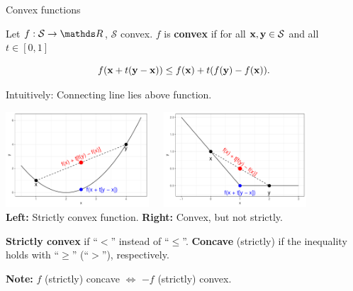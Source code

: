 \documentclass[11pt,compress,t,notes=noshow, xcolor=table]{beamer}
\begin{document}
\begin{vbframe}{Convex functions}

Let $f: \mathcal{S} \to \R$, $\mathcal{S}$ convex.
$f$ is \textbf{convex} if for all $\mathbf{x}, \mathbf{y} \in \mathcal{S}$ and all $t \in [0, 1]$

\vspace{-0.5\baselineskip}

\begin{equation*}
    f(\mathbf{x} + t(\mathbf{y} - \mathbf{x})) \le f(\mathbf{x}) + t(f(\mathbf{y}) - f(\mathbf{x})).    
\end{equation*}

Intuitively: Connecting line lies above function.

\begin{center}
    \includegraphics[width = 0.4\textwidth, keepaspectratio]{figure_man/convexity_1.pdf}~~~\includegraphics[width = 0.40\textwidth, keepaspectratio]{figure_man/convexity_2.pdf} \\
    \footnotesize{
        \textbf{Left:} Strictly convex function.
        \textbf{Right:} Convex, but not strictly. }
\end{center}

\textbf{Strictly convex} if \enquote{$<$} instead of \enquote{$\le$}. \textbf{Concave} (strictly) if the inequality holds with \enquote{$\ge$} (\enquote{$>$}), respectively. 

\vspace*{0.2cm}

\textbf{Note:} $f$ (strictly) concave $\Leftrightarrow$ $-f$ (strictly) convex.



\end{vbframe}
\end{document}
